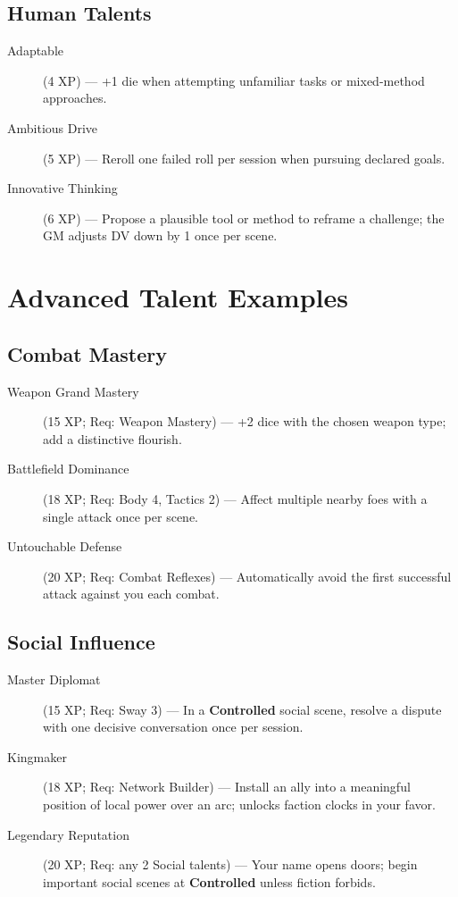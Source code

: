 \subsection*{Human Talents}
\begin{description}
\item[Adaptable] (4 XP) --- +1 die when attempting unfamiliar tasks or mixed-method approaches.
\item[Ambitious Drive] (5 XP) --- Reroll one failed roll per session when pursuing declared goals.
\item[Innovative Thinking] (6 XP) --- Propose a plausible tool or method to reframe a challenge; the GM adjusts DV down by 1 once per scene.
\end{description}

\section{Advanced Talent Examples}

\subsection*{Combat Mastery}
\begin{description}
\item[Weapon Grand Mastery] (15 XP; Req: Weapon Mastery) --- +2 dice with the chosen weapon type; add a distinctive flourish.
\item[Battlefield Dominance] (18 XP; Req: Body 4, Tactics 2) --- Affect multiple nearby foes with a single attack once per scene.
\item[Untouchable Defense] (20 XP; Req: Combat Reflexes) --- Automatically avoid the first successful attack against you each combat.
\end{description}

\subsection*{Social Influence}
\begin{description}
\item[Master Diplomat] (15 XP; Req: Sway 3) --- In a \textbf{Controlled} social scene, resolve a dispute with one decisive conversation once per session.
\item[Kingmaker] (18 XP; Req: Network Builder) --- Install an ally into a meaningful position of local power over an arc; unlocks faction clocks in your favor.
\item[Legendary Reputation] (20 XP; Req: any 2 Social talents) --- Your name opens doors; begin important social scenes at \textbf{Controlled} unless fiction forbids.
\end{description}

